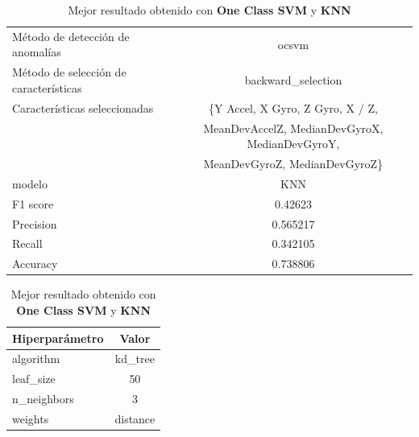 \begin{appendices}
		\begin{table}[htb]
			\centering
			\caption{Mejor resultado obtenido con \textbf{One Class SVM} y \textbf{KNN}}
			\label{table:20}
			\begin{tabular}{lc}
				\toprule
					  Método de detección de anomalías &                                              ocsvm \\
				Método de selección de características &                                 backward\_selection \\
						 Características seleccionadas & 					\{Y Accel, X Gyro, Z Gyro, X / Z, \\
						 							   &	MeanDevAccelZ, MedianDevGyroX, MedianDevGyroY,   \\
													   &	MeanDevGyroZ, MedianDevGyroZ\} \\
												modelo &                                                KNN \\
											  F1 score &                                            0.42623 \\
											 Precision &                                           0.565217 \\
												Recall &                                           0.342105 \\
											  Accuracy &                                           0.738806 \\
				\bottomrule
			\end{tabular}
			\newline
			\newline

			\begin{tabular}{lc}
				\toprule
				Hiperparámetro &    Valor \\
				\midrule
					 algorithm &  kd\_tree \\
					 leaf\_size &       50 \\
				   n\_neighbors &        3 \\
					   weights & distance \\
				\bottomrule
			\end{tabular}
			
		\end{table}
	

\end{appendices}
